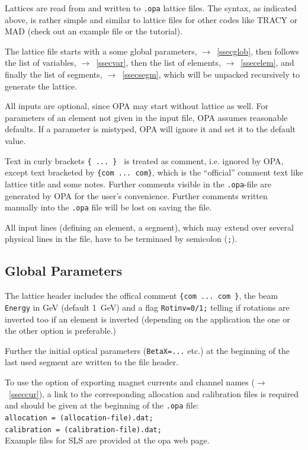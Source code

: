 \documentclass[12pt]{article}
\newcommand{\see}{\mbox{$\rightarrow$~}}
\newcommand\code[1]{{\tt #1}}
\begin{document}
Lattices are read from and written to {\tt *.opa} lattice files. The syntax, as indicated above, is rather simple and similar to lattice files for other codes like TRACY or MAD (check out an example file or the tutorial).

The lattice file starts with a some global parameters, \see\ref{ssecglob},
then follows the list of variables, \see\ref{ssecvar}, then the list of elements, \see\ref{ssecelem}, and finally the list of segments, \see\ref{ssecsegm}, which will
be unpacked recursively to generate the lattice.

All inputs are optional, since OPA may start without lattice as well.
For parameters of an element not given in the input file, OPA assumes reasonable defaults.
If a parameter is mistyped, OPA will ignore it and set it to the default value.

Text in curly brackets { \tt \{ ... \} } is treated as comment,
i.e. ignored by OPA, except text bracketed by {\tt \{com ... com\}},
which is the ``official'' comment text like lattice title and some notes.
Further comments visible in the {\tt *.opa}-file are generated by OPA
for the user's convenience. Further comments written manually into
the {\tt *.opa} file will be lost on saving the file.

All input lines (defining an element, a segment), which may extend over several physical lines in the file, have to be terminaed by semicolon ({\tt ;}).

\subsection{\label{ssecglob}Global Parameters}
The lattice header includes the offical comment {\tt \{com ... com \}},
the beam {\tt Energy} in GeV (default 1~GeV) and a flag {\tt Rotinv=0/1;} telling if rotations are inverted too if an element is inverted (depending on the application the one or the other option is preferable.)

Further the initial optical parameters ({\tt BetaX=...} etc.) at the beginning of the last used segment are written to the file header.

To use the option of exporting magnet currents and channel names (\see\ref{sseccur}), a
link to the corresponding allocation and calibration files is required
and should be given at the beginning of the {\tt *.opa} file:\\
\code{allocation  = (allocation-file).dat;}\\
\code{calibration = (calibration-file).dat;}\\
Example files for SLS are provided at the opa web page.
\end{document}
